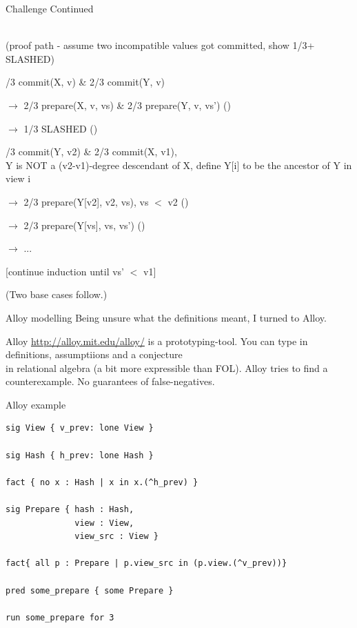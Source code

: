 \documentclass{beamer}
\begin{document}
\begin{frame}{Challenge Continued}

  \\ (proof path - assume two incompatible values got committed, show 1/3+ SLASHED)


/3 commit(X, v) \& 2/3 commit(Y, v)

$\rightarrow$ 2/3 prepare(X, v, vs) \& 2/3 prepare(Y, v, vs')  ()

$\rightarrow$ 1/3 SLASHED ()


/3 commit(Y, v2) \& 2/3 commit(X, v1),\\ Y is NOT a (v2-v1)-degree descendant of X, define Y[i] to be the ancestor of Y in view i

$\rightarrow$ 2/3 prepare(Y[v2], v2, vs), vs $<$ v2 ()

$\rightarrow$ 2/3 prepare(Y[vs], vs, vs') ()

$\rightarrow$ ...

[continue induction until vs' $<$ v1]

(Two base cases follow.)

\end{frame}

\begin{frame}{Alloy modelling}
Being unsure what the definitions meant, I turned to Alloy.

Alloy \url{http://alloy.mit.edu/alloy/} is a prototyping-tool.
\vfill
You can type in definitions, assumptiions and a conjecture \\
in relational algebra (a bit more expressible than FOL).
\vfill
Alloy tries to find a counterexample.  No guarantees of false-negatives.
\end{frame}

\begin{frame}[fragile]{Alloy example}

\begin{verbatim}
sig View { v_prev: lone View }

sig Hash { h_prev: lone Hash }

fact { no x : Hash | x in x.(^h_prev) }

sig Prepare { hash : Hash,
              view : View,
              view_src : View }

fact{ all p : Prepare | p.view_src in (p.view.(^v_prev))}

pred some_prepare { some Prepare }

run some_prepare for 3
\end{verbatim}

\end{frame}
\end{document}
